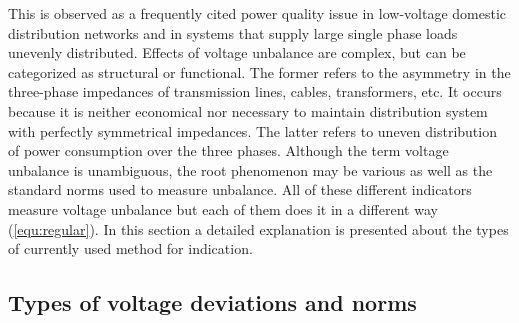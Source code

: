 	
	This is observed as a frequently cited power quality issue in low-voltage domestic distribution networks and in systems that supply large single phase loads unevenly distributed. Effects of voltage unbalance are complex, but can be categorized as structural or functional. The former refers to the asymmetry in the three-phase impedances of transmission lines, cables, transformers, etc. It occurs because it is neither economical nor necessary to maintain distribution system with perfectly symmetrical impedances. The latter refers to uneven distribution of power consumption over the three phases. Although the term voltage unbalance is unambiguous, the root phenomenon may be various as well as the standard norms used to measure unbalance. All of these different indicators measure voltage unbalance but each of them does it in a different way (\ref{equ:regular}). In this section a detailed explanation is presented about the types of currently used method for indication.
	
	\subsection{Types of voltage deviations and norms}\label{BASICUNB:sec:DefinitionsofUNB}

